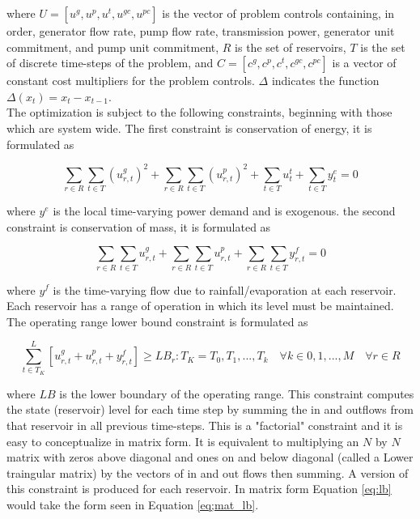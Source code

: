 \documentclass[12pt]{article}
\begin{document}
where $U=[u^g,u^p,u^t,u^{gc},u^{pc}]$ is the vector of problem controls containing, in order, generator flow rate, pump flow rate, transmission power, generator unit commitment, and pump unit commitment, $R$ is the set of reservoirs, $T$ is the set of discrete time-steps of the problem, and $C=[c^g,c^p,c^t,c^{gc},c^{pc}]$ is a vector of constant cost multipliers for the problem controls. $\Delta$ indicates the function $\Delta(x_t)=x_t-x_{t-1}$.\\

The optimization is subject to the following constraints, beginning with those which are system wide. The first constraint is conservation of energy, it is formulated as

\begin{equation}
	\sum_{r\in R}\sum_{t\in T}(u_{r,t}^{g})^2+
	\sum_{r\in R}\sum_{t\in T}(u_{r,t}^{p})^2+
	\sum_{t\in T}u_{t}^{t}+
	\sum_{t\in T}y_{t}^{e}=0\label{eq:coe}
\end{equation}

where $y^e$ is the local time-varying power demand and is exogenous. the second constraint is conservation of mass, it is formulated as

\begin{equation}
	\sum_{r\in R}\sum_{t\in T}u_{r,t}^{g}+
	\sum_{r\in R}\sum_{t\in T}u_{r,t}^{p}+
	\sum_{r\in R}\sum_{t\in T}y_{r,t}^{f}=0\label{eq:com}
\end{equation}

where $y^f$ is the time-varying flow due to rainfall/evaporation at each reservoir.\\

Each reservoir has a range of operation in which its level must be maintained. The operating range lower bound constraint is formulated as

\begin{equation}
	\sum_{t\in T_K}^{L}[u_{r,t}^{g}+u_{r,t}^{p}+y_{r,t}^{f}]\geq LB_{r} : T_K=T_0,T_1,...,T_k \quad\forall k \in 0,1,...,M \quad\forall r \in R \label{eq:lb}
\end{equation}

where $LB$ is the lower boundary of the operating range. This constraint computes the state (reservoir) level for each time step by summing the in and outflows from that reservoir in all previous time-steps. This is a "factorial" constraint and it is easy to conceptualize in matrix form. It is equivalent to multiplying an $N$ by $N$ matrix with zeros above diagonal and ones on and below diagonal (called a Lower traingular matrix) by the vectors of in and out flows then summing. A version of this constraint is produced for each reservoir. In matrix form Equation \eqref{eq:lb} would take the form seen in Equation \eqref{eq;mat_lb}.
\end{document}
